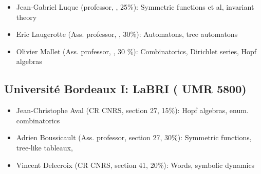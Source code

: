 
\begin{itemize}
\item Jean-Gabriel Luque (professor, \CS, 25\%): Symmetric functions
  et al,
  invariant theory%

\item Eric Laugerotte (Ass. professor, \CS, 30\%): %
  Automatons, tree automatons%
\item Olivier Mallet (Ass. professor, \CS, 30 \%): %
  Combinatorics, Dirichlet series, Hopf algebras
\end{itemize}

\vspace{-1.2ex}
\subsection*{Université Bordeaux I: LaBRI (%
  UMR 5800)}

\begin{itemize}
\item Jean-Christophe Aval (CR CNRS, section 27, 15\%): %
  Hopf algebras, enum. combinatorics%
\item Adrien Boussicault (Ass. professor, section 27, 30\%): %
  Symmetric functions, tree-like tableaux, %
\item Vincent Delecroix (CR CNRS, section 41, 20\%): Words, symbolic dynamics
\end{itemize}

